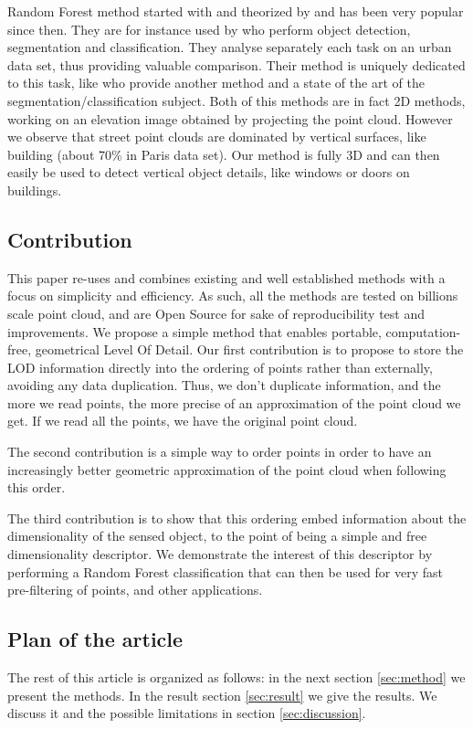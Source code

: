 		Random Forest method started with \cite{Amit97shapequantization} and theorized by \cite{Breiman2001} and has been very popular since then. They are for instance used by \cite{Golovinskiy2009} who perform object detection, segmentation and classification. They analyse separately each task on an urban data set, thus providing valuable comparison. Their method is uniquely dedicated to this task, like \cite{Serna2014} who provide another method and a state of the art of the segmentation/classification subject.
		Both of this methods are in fact 2D methods, working on an elevation image obtained by projecting the point cloud. However we observe that street point clouds are dominated by vertical surfaces, like building (about 70\% in Paris data set). Our method is fully 3D and can then easily be used to detect vertical object details, like windows or doors on buildings.
		 
	
	\subsection{Contribution}
		This paper re-uses and combines existing and well established methods with a focus on simplicity and efficiency. As such, all the methods are tested on billions scale point cloud, and are Open Source for sake of reproducibility test and improvements.
		We propose a simple method that enables portable, computation-free, geometrical Level Of Detail.
		Our first contribution is to propose to store the LOD information directly into the ordering of points rather than externally, avoiding any data duplication.
		Thus, we don't duplicate information, and the more we read points, the more precise of an approximation of the point cloud we get. If we read all the points, we have the original point cloud.
		
		The second contribution is a simple way to order points in order to have an increasingly better geometric approximation of the point cloud when following this order.
		
		The third contribution is to show that this ordering embed information about the dimensionality of the sensed object,
		to the point of being a simple and free dimensionality descriptor.
		We demonstrate the interest of this descriptor by performing a Random Forest classification that can then be used for very fast pre-filtering of points, and other applications.
			
		
	\subsection{Plan of the article}
		The rest of this article is organized as follows:
		in the next section \ref{sec:method} we present the methods.  
		In the result section \ref{sec:result} we give the results.
		We discuss it and the possible limitations in section \ref{sec:discussion}.
		
